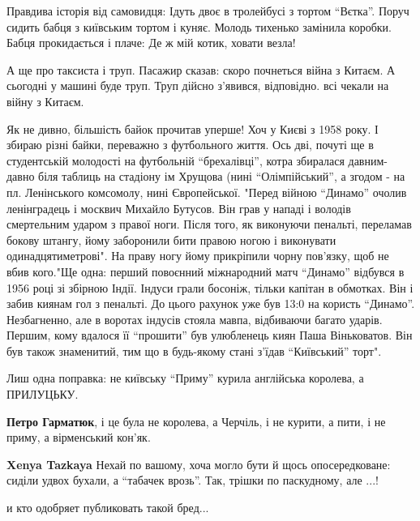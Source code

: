 \begin{itemize}

Правдива історія від самовидця: Ідуть двоє в тролейбусі з тортом \enquote{Вєтка}. Поруч
сидить бабця з київським тортом і куняє. Молодь тихенько замінила коробки.
Бабця прокидається і плаче: Де ж мій котик, ховати везла!



А ще про таксиста і труп. Пасажир сказав: скоро почнеться війна з Китаєм. А
сьогодні у машині буде труп. Труп дійсно з'явився, відповідно. всі чекали на
війну з Китаєм.


Як не дивно, більшість байок прочитав уперше! Хоч у Києві з 1958 року. І збираю
різні байки, переважно з футбольного життя. Ось дві, почуті ще в студентській
молодості на футбольній \enquote{брехалівці}, котра збиралася давним-давно біля таблиць
на стадіону ім Хрущова (нині \enquote{Олімпійський}, а згодом - на пл. Ленінського
комсомолу, нині Європейської. "Перед війною \enquote{Динамо} очолив ленінградець і
москвич Михайло Бутусов. Він грав у нападі і володів смертельним ударом з
правої ноги. Після того, як виконуючи пенальті, переламав бокову штангу, йому
заборонили бити правою ногою і виконувати одинадцятиметрові". На праву ногу
йому прикріпили чорну пов'язку, щоб не вбив кого."Ще одна: перший повоєнний
міжнародний матч \enquote{Динамо} відбувся в 1956 році зі збірною Індії. Індуси грали
босоніж, тільки капітан в обмотках. Він і забив киянам гол з пенальті. До цього
рахунок уже був 13:0 на користь \enquote{Динамо}. Незбагненно, але в воротах індусів
стояла мавпа, відбиваючи багато ударів. Першим, кому вдалося її \enquote{прошити} був
улюбленець киян Паша Віньковатов. Він був також знаменитий, тим що в будь-якому
стані з'їдав \enquote{Київський} торт".


Лиш одна поправка: не київську \enquote{Приму} курила англійська королева, а
ПРИЛУЦЬКУ.

\begin{itemize} %
\textbf{Петро Гарматюк}, і це була не королева, а Черчіль, і не курити, а пити, і не приму, а вірменський кон'як.

\textbf{Xenya Tazkaya}
Нехай по вашому, хоча могло бути й щось опосередковане: сиділи удвох бухали, а \enquote{табачек врозь}.
Так, трішки по паскудному, але ...!
\end{itemize} %

и кто одобряет публиковать такой бред...


\end{itemize}
